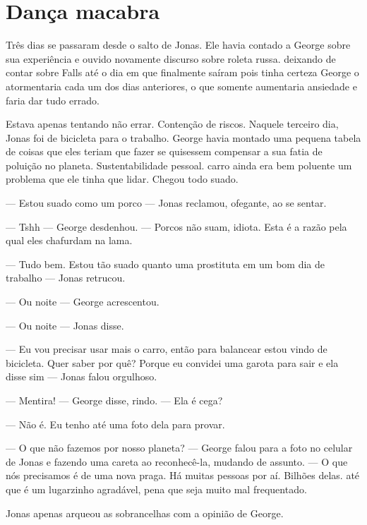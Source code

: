 \chapter{Dança macabra}

Três dias se passaram desde o salto de Jonas. Ele havia contado a George sobre sua experiência e ouvido\mudanca{,} novamente discurso sobre roleta russa.  deixando de contar sobre Falls até o dia em que finalmente saíram\mudanca{,} pois tinha certeza  George o atormentaria  cada um dos dias anteriores, o que somente aumentaria  ansiedade e faria dar tudo errado.

Estava apenas tentando não errar. Contenção de riscos. Naquele terceiro dia, Jonas foi de bicicleta para o trabalho. George havia montado uma pequena tabela de coisas que eles teriam que fazer se quisessem compensar a sua fatia de poluição no planeta. Sustentabilidade pessoal.  carro ainda era bem poluente\mudanca{,} um problema que ele tinha que lidar. Chegou todo suado.

--- Estou suado como um porco --- Jonas reclamou, ofegante, ao se sentar.

--- Tshh --- George desdenhou. --- Porcos não suam, idiota. Esta é a razão pela qual eles chafurdam na lama.

--- Tudo bem. Estou tão suado quanto uma prostituta em um bom dia de trabalho --- Jonas retrucou.

--- Ou noite --- George acrescentou.

--- Ou noite --- Jonas disse.

--- Eu vou precisar usar mais o carro, então\mudanca{,} para balancear\mudanca{,} estou vindo de bicicleta. Quer saber por quê? Porque eu convidei uma garota para sair e ela disse sim --- Jonas falou\mudanca{,} orgulhoso.

--- Mentira! --- George disse, rindo. --- Ela é cega?

--- Não é. Eu tenho até uma foto dela para provar.

--- O que não fazemos por nosso planeta? --- George falou para a foto no celular de Jonas e fazendo uma careta ao reconhecê-la, mudando de assunto. --- O que nós precisamos é de uma nova praga. Há muitas pessoas por aí. Bilhões delas.  até que é um lugarzinho agradável, pena que seja muito mal frequentado.

Jonas apenas arqueou as sobrancelhas com a opinião de George.

